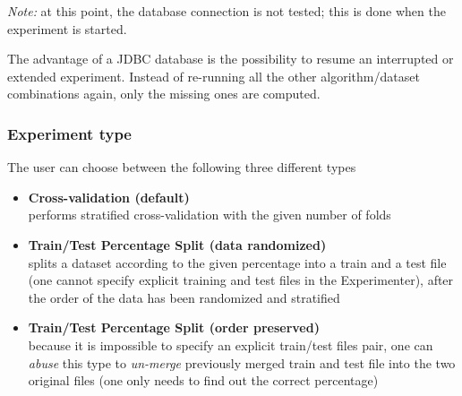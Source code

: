 \textit{Note:} at this point, the database connection is not tested; this is done when the experiment is started.

\begin{center}
\end{center}


The advantage of a JDBC database is the possibility to resume an interrupted or extended experiment. Instead of re-running all the other algorithm/dataset combinations again, only the missing ones are computed.


\subsubsection{Experiment type}

The user can choose between the following three different types

\begin{itemize}
	\item \textbf{Cross-validation (default)} \\
      performs stratified cross-validation with the given number of folds 

   \item \textbf{Train/Test Percentage Split (data randomized)} \\
      splits a dataset according to the given percentage into a train and a test file (one cannot specify explicit training and test files in the Experimenter), after the order of the data has been randomized and stratified
	
	\begin{center}
	\end{center}

    \item \textbf{Train/Test Percentage Split (order preserved)} \\
      because it is impossible to specify an explicit train/test files pair, one can \textit{abuse} this type to \textit{un-merge} previously merged train and test file into the two original files (one only needs to find out the correct percentage) 
	
	\begin{center}
	\end{center}
	
\end{itemize}

